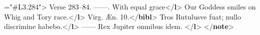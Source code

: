 \begin{shaded}
{\hspace*{1em}{target}="{\#L3.284}">}\mbox{}\newline 
{}Verse 283–84.\mbox{}\newline 
{}\mbox{}\newline 
\hspace*{1em}\hspace*{1em}——. With equal grace{</\textbf{l}>}\mbox{}\newline 
\hspace*{1em}\hspace*{1em}Our Goddess smiles on Whig and Tory race.{</\textbf{l}>}\mbox{}\newline 
\hspace*{1em}\mbox{}\newline 
{}\mbox{}\newline 
{}Virg. Æn. 10.{</\textbf{bibl}>}\mbox{}\newline 
{}\mbox{}\newline 
\hspace*{1em}Tros Rutulusve fuat; nullo discrimine habebo.{</\textbf{l}>}\mbox{}\newline 
\hspace*{1em}—— Rex Jupiter omnibus idem. {</\textbf{l}>}\mbox{}\newline 
{}\mbox{}\newline 
{</\textbf{note}>}\end{shaded}\egroup\par \noindent  \par
